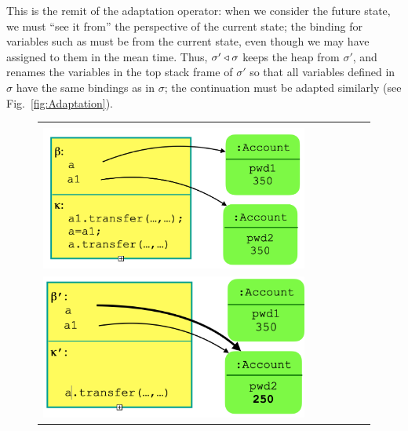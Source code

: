 This is the remit of the adaptation operator: when we consider the
future state, we must ``see it from'' the perspective of the current
state; the binding for variables such as  must be from the
current state, even though we may have assigned to them in the mean
time.  Thus, $\sigma' \triangleleft \sigma$ keeps the heap from $\sigma'$,
and renames the variables
in the top stack frame of  $\sigma'$ so that all variables defined in $\sigma$ have the same 
bindings
as in   $\sigma$; the continuation must be adapted similarly (see
Fig.~\ref{fig:Adaptation}).
%
%
\begin{figure}[htbp]
\begin{tabular}{clclc}
 \begin{minipage}{0.27\textwidth}
 $\sigma:$\\
 \includegraphics[width=\linewidth]{diagrams/adapt1.png}
   \end{minipage}
 & \ \ \ &
 \begin{minipage}{0.27\textwidth}
  $\sigma':$\\
  \includegraphics[width=\linewidth]{diagrams/adapt2.png}

\end{minipage}
\end{tabular}
\end{figure}
